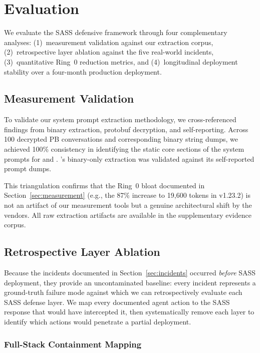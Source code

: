 \section{Evaluation}
\label{sec:eval}

We evaluate the SASS defensive framework through four complementary analyses: (1)~measurement validation against our extraction corpus, (2)~retrospective layer ablation against the five real-world incidents, (3)~quantitative Ring~0 reduction metrics, and (4)~longitudinal deployment stability over a four-month production deployment.

\subsection{Measurement Validation}
To validate our system prompt extraction methodology, we cross-referenced findings from binary extraction, protobuf decryption, and self-reporting. Across 100 decrypted PB conversations and corresponding binary string dumps, we achieved 100\% consistency in identifying the static core sections of the system prompts for \cortex{} and \statsig{}. \clearcut{}'s binary-only extraction was validated against its self-reported prompt dumps.

This triangulation confirms that the Ring~0 bloat documented in Section~\ref{sec:measurement} (e.g., the 87\% increase to 19,600 tokens in \cortex{} v1.23.2) is not an artifact of our measurement tools but a genuine architectural shift by the vendors. All raw extraction artifacts are available in the supplementary evidence corpus.

\subsection{Retrospective Layer Ablation}
\label{sec:ablation}

Because the incidents documented in Section~\ref{sec:incidents} occurred \emph{before} SASS deployment, they provide an uncontaminated baseline: every incident represents a ground-truth failure mode against which we can retrospectively evaluate each SASS defense layer. We map every documented agent action to the SASS response that would have intercepted it, then systematically remove each layer to identify which actions would penetrate a partial deployment.

\subsubsection{Full-Stack Containment Mapping}

